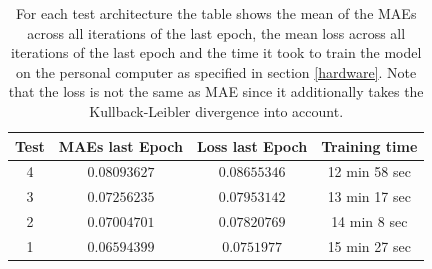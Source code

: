 \begin{center}
    \begin{table}[H]
        \centering
        \begin{tabular}{ | c | c | c | c | }
            \hline
            Test &MAEs last Epoch & Loss last Epoch & Training time\\ \hline
            4 & $0.08093627$  & $0.08655346$  & 12 min 58 sec  \\
            3 & $0.07256235$  & $0.07953142$  & 13 min 17 sec  \\
            2 & $0.07004701$  & $0.07820769$  & 14 min 8 sec  \\  
            1 & $0.06594399$  & $0.0751977$  & 15 min 27 sec  \\  
            \hline
        \end{tabular} 
        \caption{For each test architecture the table shows the mean of the MAEs across all iterations of the last
        epoch, the mean loss across all iterations of the last epoch and the time it took to train the model
        on the personal computer as specified in section \ref{hardware}. Note that the loss is not the same
        as MAE since it additionally takes the Kullback-Leibler divergence into account.}
    \end{table} \label{table_mae_1}
\end{center}


